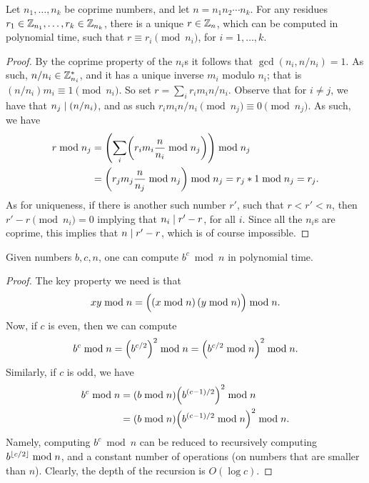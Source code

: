 \begin{theorem}%
    Let $n_1, \ldots, n_k$ be coprime numbers, and let $n = n_1 n_2
    \cdots n_k$. For any residues $r_1 \in \mathbb{Z}_{n_1}, \ldots, r_k \in
    \mathbb{Z}_{n_k}$, there is a unique $r \in \mathbb{Z}_n$, which can be computed
    in polynomial time, such that $r \equiv r_i \pmod{n_i}$, for $i=1,
    \ldots, k$.
\end{theorem}
\begin{proof}
    By the coprime property of the $n_i${}s it follows that $\gcd(n_i,
    n/n_i) = 1$. As such, $n/n_i \in \mathbb{Z}_{n_i}^*$, and it has a unique
    inverse $m_i$ modulo $n_i$; that is $(n/n_i) m_i \equiv 1
    \pmod{n_i}$. So set $r = \sum_i r_i m_i n/n_i$. Observe that for
    $i \neq j$, we have that $n_j \divides \pth[]{n/n_i}$, and as such
    $r_i m_i n/n_i \pmod{n_j} \equiv 0 \pmod{n_j}$. As such, we have
    \begin{align*}
        r \bmod{n_j}%
        &=%
        \pth[]{\sum_i \pth{ r_i m_i \frac{n}{n_i} \bmod{n_j}}}
        \bmod{n_j}\\
        &=%
        \pth[]{r_j m_j \frac{n}{n_j} \bmod{n_j}} \bmod{n_j}%
        =%
        r_j * 1 \bmod{n_j}%
        =%
        r_j.
    \end{align*}
    As for uniqueness, if there is another such number $r'$, such that
    $r < r' < n$, then $r' - r \pmod{n_i} = 0$ implying that $n_i
    \mid r' -r$, for all $i$. Since all the $n_i$s are coprime,
    this implies that $n \mid r' -r$, which is of course
    impossible.
\end{proof}

\begin{lemma}
    Given numbers $b,c, n$, one can compute $b^c \bmod n$ in
    polynomial time.
\end{lemma}

\begin{proof}
    The key property we need is that
    \begin{align*}
        x y \bmod n = \pth[]{\Bigl. (x\bmod n) \, (y \bmod n)} \bmod
        n.
    \end{align*}
    Now, if $c$ is even, then we can compute
    \begin{align*}
        b^c \bmod n%
        =%
        \pth[]{b^{c/2}}^2 \bmod n%
        =%
        \pth[]{b^{c/2} \bmod n }^2 \bmod n.%
    \end{align*}
    Similarly, if $c$ is odd, we have
    \begin{align*}
        b^c \bmod n%
        &=%
        \pth[]{b \bmod n} \pth[]{b^{(c-1)/2}}^2 \bmod n\\
        &=%
        \pth[]{b \bmod n} \pth[]{b^{(c-1)/2} \bmod n }^2 \bmod n.%
    \end{align*}
    Namely, computing $b^c \bmod n$ can be reduced to recursively
    computing $b^{\left\lfloor {c/2} \right\rfloor} \bmod n$, and a constant number of
    operations (on numbers that are smaller than $n$). Clearly, the
    depth of the recursion is $O( \log c)$.
\end{proof}

